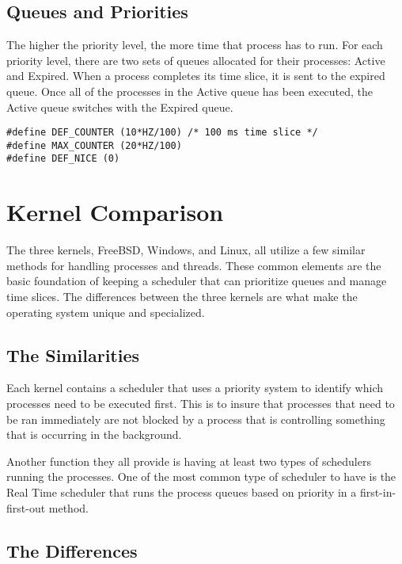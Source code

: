 \documentclass[10pt, draftclsnofoot,onecolumn]{IEEEtran}
\begin{document}
\subsection{Queues and Priorities}

The higher the priority level, the more time that process has to run. For each
priority level, there are two sets of queues allocated for their processes: Active
and Expired. When a process completes its time slice, it is sent to the expired
queue. Once all of the processes in the Active queue has been executed,  the
Active queue switches with the Expired queue.

\begin{lstlisting}[caption={ the default, max, and nice() time slice },label={lst:label}]
#define DEF_COUNTER (10*HZ/100) /* 100 ms time slice */
#define MAX_COUNTER (20*HZ/100)
#define DEF_NICE (0)
\end{lstlisting}


\section{Kernel Comparison}

The three kernels, FreeBSD, Windows, and Linux, all utilize a few similar methods
for handling processes and threads. These common elements are the basic foundation
of keeping a scheduler that can prioritize queues and manage time slices. The
differences between the three kernels are what make the operating system unique and specialized.

\subsection{The Similarities}

Each kernel contains a scheduler that uses a priority system to identify which
processes need to be executed first. This is to insure that processes that need
to be ran immediately are not blocked by a process that is controlling something
that is occurring in the background.\par
Another function they all provide is having at least two types of schedulers
running the processes. One of the most common type of scheduler to have is the
Real Time scheduler that runs the process queues based on priority in a
first-in-first-out method.\par

\subsection{The Differences}
\end{document}
